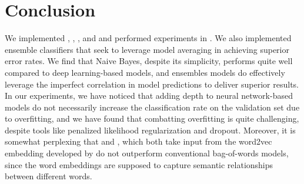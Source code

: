 \documentclass[11pt]{article}
\begin{document}


\section{Conclusion}
We implemented , , 
, and  and performed
experiments in . We also implemented ensemble classifiers
that seek to leverage model averaging in achieving superior error rates. We find
that Naive Bayes, despite its simplicity, performs quite well compared to
deep learning-based models, and ensembles models do effectively leverage the
imperfect correlation in model predictions to deliver superior results. In our
experiments, we have noticed that adding depth to neural network-based models do
not necessarily increase the classification rate on the validation set due to
overfitting, and we have found that combatting overfitting is quite challenging,
despite tools like penalized likelihood regularization and dropout. Moreover, it
is somewhat perplexing that  and ,
which both take input from the \textsf{word2vec} embedding developed by 
\cite{mikolov2013efficient} do not outperform conventional bag-of-words models,
since the word embeddings are supposed to capture semantic relationships between
different words. 




\end{document}
